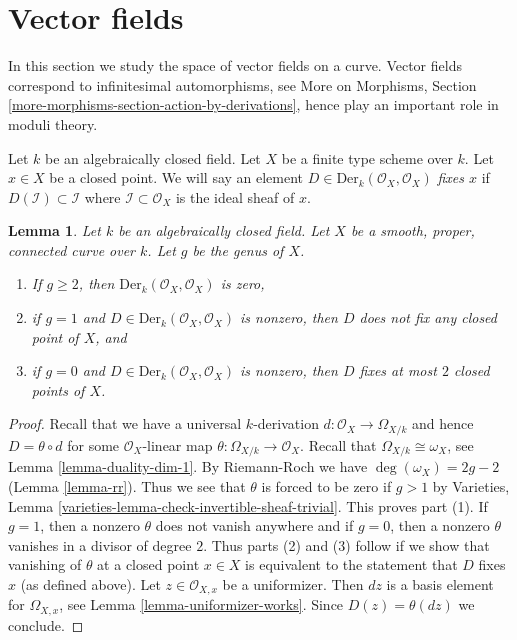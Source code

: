 \documentclass{stacks-project}
\theoremstyle{plain}
\newtheorem{lemma}[subsection]{Lemma}
\theoremstyle{definition}
\theoremstyle{remark}
\numberwithin{equation}{subsection}
\begin{document}
\section{Vector fields}
\label{section-vector-fields}

\noindent
In this section we study the space of vector fields on a curve.
Vector fields correspond to infinitesimal automorphisms, see
More on Morphisms, Section \ref{more-morphisms-section-action-by-derivations},
hence play an important role in moduli theory.

\medskip\noindent
Let $k$ be an algebraically closed field.
Let $X$ be a finite type scheme over $k$.
Let $x \in X$ be a closed point.
We will say an element $D \in \text{Der}_k(\mathcal{O}_X, \mathcal{O}_X)$
{\it fixes $x$} if $D(\mathcal{I}) \subset \mathcal{I}$ where
$\mathcal{I} \subset \mathcal{O}_X$ is the ideal sheaf of $x$.

\begin{lemma}
\label{lemma-smooth-vector-fields}
Let $k$ be an algebraically closed field.
Let $X$ be a smooth, proper, connected curve over $k$.
Let $g$ be the genus of $X$.
\begin{enumerate}
\item If $g \geq 2$, then $\text{Der}_k(\mathcal{O}_X, \mathcal{O}_X)$
is zero,
\item if $g = 1$ and $D \in \text{Der}_k(\mathcal{O}_X, \mathcal{O}_X)$
is nonzero, then $D$ does not fix any closed point of $X$, and
\item if $g = 0$ and $D \in \text{Der}_k(\mathcal{O}_X, \mathcal{O}_X)$
is nonzero, then $D$ fixes at most $2$ closed points of $X$.
\end{enumerate}
\end{lemma}

\begin{proof}
Recall that we have a universal $k$-derivation
$d : \mathcal{O}_X \to \Omega_{X/k}$ and hence $D = \theta \circ d$
for some $\mathcal{O}_X$-linear map $\theta : \Omega_{X/k} \to \mathcal{O}_X$.
Recall that $\Omega_{X/k} \cong \omega_X$, see
Lemma \ref{lemma-duality-dim-1}.
By Riemann-Roch we have $\deg(\omega_X) = 2g - 2$
(Lemma \ref{lemma-rr}).
Thus we see that $\theta$ is forced to be zero
if $g > 1$ by Varieties, Lemma
\ref{varieties-lemma-check-invertible-sheaf-trivial}.
This proves part (1).
If $g = 1$, then a nonzero $\theta$ does not vanish anywhere and if
$g = 0$, then a nonzero $\theta$ vanishes in a divisor of degree $2$.
Thus parts (2) and (3) follow if we show that
vanishing of $\theta$ at a closed point $x \in X$ is
equivalent to the statement that $D$ fixes $x$ (as defined above).
Let $z \in \mathcal{O}_{X, x}$ be a uniformizer.
Then $dz$ is a basis element for $\Omega_{X, x}$, see
Lemma \ref{lemma-uniformizer-works}.
Since $D(z) = \theta(dz)$ we conclude.
\end{proof}
\end{document}
